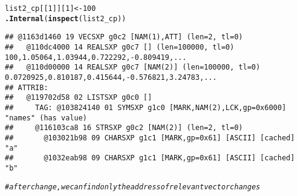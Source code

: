 \documentclass{article}\usepackage[]{graphicx}\usepackage[]{color}
\makeatletter
\newcommand{\hlnum}[1]{\textcolor[rgb]{0.686,0.059,0.569}{#1}}%
\newcommand{\hlcom}[1]{\textcolor[rgb]{0.678,0.584,0.686}{\textit{#1}}}%
\newcommand{\hlstd}[1]{\textcolor[rgb]{0.345,0.345,0.345}{#1}}%
\newcommand{\hlkwb}[1]{\textcolor[rgb]{0.69,0.353,0.396}{#1}}%
\newcommand{\hlkwd}[1]{\textcolor[rgb]{0.737,0.353,0.396}{\textbf{#1}}}%
\newenvironment{kframe}{%
 \def\at@end@of@kframe{}%
 \ifinner\ifhmode%
  \def\at@end@of@kframe{\end{minipage}}%
  \begin{minipage}{\columnwidth}%
 \fi\fi%
 \def\FrameCommand##1{\hskip\@totalleftmargin \hskip-\fboxsep
 \colorbox{shadecolor}{##1}\hskip-\fboxsep
     \hskip-\linewidth \hskip-\@totalleftmargin \hskip\columnwidth}%
 \MakeFramed {\advance\hsize-\width
   \@totalleftmargin\z@ \linewidth\hsize
   \@setminipage}}%
 {\par\unskip\endMakeFramed%
 \at@end@of@kframe}
\newenvironment{knitrout}{}{} %
\makeatother
\begin{document}
\begin{knitrout}
\begin{kframe}
\begin{alltt}
\hlstd{list2_cp[[}\hlnum{1}\hlstd{]][}\hlnum{1}\hlstd{]}\hlkwb{<-}\hlnum{100}
\hlkwd{.Internal}\hlstd{(}\hlkwd{inspect}\hlstd{(list2_cp))}
\end{alltt}
\begin{verbatim}
## @1163d1460 19 VECSXP g0c2 [NAM(1),ATT] (len=2, tl=0)
##   @110dc4000 14 REALSXP g0c7 [] (len=100000, tl=0) 100,1.05064,1.03944,0.722292,-0.809419,...
##   @110d00000 14 REALSXP g0c7 [NAM(2)] (len=100000, tl=0) 0.0720925,0.810187,0.415644,-0.576821,3.24783,...
## ATTRIB:
##   @119702d58 02 LISTSXP g0c0 [] 
##     TAG: @103824140 01 SYMSXP g1c0 [MARK,NAM(2),LCK,gp=0x6000] "names" (has value)
##     @116103ca8 16 STRSXP g0c2 [NAM(2)] (len=2, tl=0)
##       @103021b98 09 CHARSXP g1c1 [MARK,gp=0x61] [ASCII] [cached] "a"
##       @1032eab98 09 CHARSXP g1c1 [MARK,gp=0x61] [ASCII] [cached] "b"
\end{verbatim}
\begin{alltt}
\hlcom{#after change, we can find only the address of relevant vector changes}
\end{alltt}
\end{kframe}
\end{knitrout}
\end{document}
